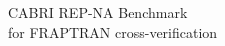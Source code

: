 \begin{frame}{}
    \centering
    \Huge{CABRI REP-NA Benchmark}\\
    \large{for FRAPTRAN cross-verification}
\end{frame}